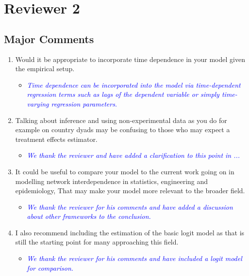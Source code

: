 \section{Reviewer 2}

\subsection{Major Comments}

\begin{enumerate}
	\item Would it be appropriate to incorporate time dependence in your model given the empirical setup.
	\begin{itemize}
		\item \textcolor{blue}{ \emph{
		Time dependence can be incorporated into the model via time-dependent regression terms such as lags of the dependent variable or simply time-varying regression parameters.
		}}
	\end{itemize}
	\item Talking about inference and using non-experimental data as you do for example on country dyads may be confusing to those who may expect a treatment effects estimator.
	\begin{itemize}
		\item \textcolor{blue}{ \emph{
		We thank the reviewer and have added a clarification to this point in ...
		}}
	\end{itemize}	
	\item It could be useful to compare your model to the current work going on in modelling network interdependence in statistics, engineering and epidemiology, That may make your model more relevant to the broader field.
	\begin{itemize}
		\item \textcolor{blue}{ \emph{
		We thank the reviewer for his comments and have added a discussion about other frameworks to the conclusion.
		}}
	\end{itemize}	
	\item I also recommend including the estimation of the basic logit model as that is still the starting point for many approaching this field.
	\begin{itemize}
		\item \textcolor{blue}{ \emph{
		We thank the reviewer for his comments and have included a logit model for comparison.
		}}
	\end{itemize}	
\end{enumerate}